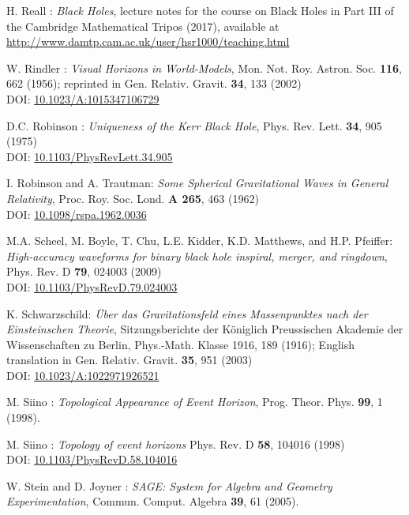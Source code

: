 \begin{thebibliography}{123}
H. Reall : {\em Black Holes}, lecture notes for the course on Black Holes in
Part III of the Cambridge Mathematical Tripos (2017), available at \\
\url{http://www.damtp.cam.ac.uk/user/hsr1000/teaching.html}

W. Rindler : {\em Visual Horizons in World-Models},
Mon. Not. Roy. Astron. Soc. {\bf 116}, 662 (1956);
reprinted in Gen. Relativ. Gravit. {\bf 34}, 133 (2002)\\
DOI: \href{https://doi.org/10.1023/A:1015347106729}{10.1023/A:1015347106729}

D.C. Robinson : {\em Uniqueness of the Kerr Black Hole},
Phys. Rev. Lett. {\bf 34}, 905 (1975)\\
DOI: \href{https://doi.org/10.1103/PhysRevLett.34.905}{10.1103/PhysRevLett.34.905}

I. Robinson and A. Trautman: {\em Some Spherical Gravitational Waves in General Relativity},
Proc. Roy. Soc. Lond. {\bf A 265}, 463 (1962)\\
DOI: \href{https://doi.org/10.1098/rspa.1962.0036}{10.1098/rspa.1962.0036}

M.A. Scheel, M. Boyle, T. Chu, L.E. Kidder, K.D. Matthews, and H.P. Pfeiffer:
{\em High-accuracy waveforms for binary black hole inspiral, merger, and ringdown},
Phys. Rev. D {\bf 79}, 024003 (2009)\\
DOI: \href{https://doi.org/10.1103/PhysRevD.79.024003}{10.1103/PhysRevD.79.024003}

K. Schwarzschild:
{\em \"Uber das Gravitationsfeld eines Massenpunktes nach der Einsteinschen Theorie},
Sitzungsberichte der K\"oniglich Preussischen Akademie der Wissenschaften zu Berlin, Phys.-Math. Klasse 1916, 189 (1916);
English translation in Gen. Relativ. Gravit. {\bf 35}, 951 (2003)\\
DOI: \href{https://doi.org/10.1023/A:1022971926521}{10.1023/A:1022971926521}

M. Siino : {\em Topological Appearance of Event Horizon},
Prog. Theor. Phys. {\bf 99}, 1 (1998).

M. Siino : {\em Topology of event horizons}
Phys. Rev. D {\bf 58}, 104016 (1998)\\
DOI: \href{https://doi.org/10.1103/PhysRevD.58.104016}{10.1103/PhysRevD.58.104016}

W. Stein and D. Joyner : {\em SAGE: System for Algebra and Geometry Experimentation},
Commun. Comput. Algebra {\bf 39}, 61 (2005).


\end{thebibliography}
